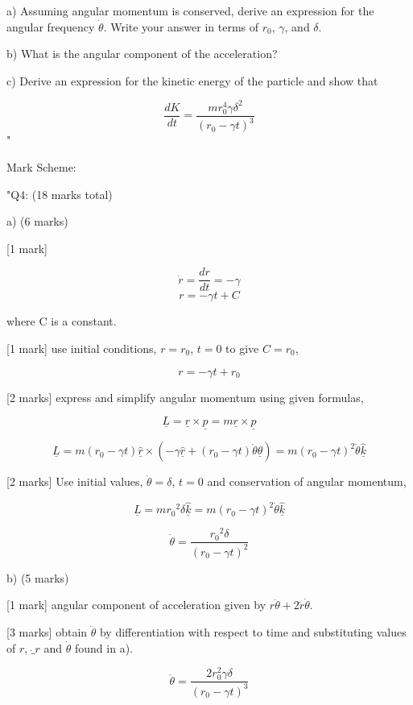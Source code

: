 a) Assuming angular momentum is conserved, derive an expression for the angular frequency \( \dot{\theta} \). Write your answer in terms of \( r_{0} \), \( \gamma \), and \( \delta \).
    
b) What is the angular component of the acceleration?
    
c) Derive an expression for the kinetic energy of the particle and show that 
    
\[
\frac{dK}{dt} = \frac{m r_{0}^{4} \gamma \delta^{2}}{(r_{0} - \gamma t)^{3}}
\]"

Mark Scheme:

"{Q4: (18 marks total)}

a) (6 marks)

[1 mark] 

\[ \dot{r} = \frac{dr}{dt} = - \gamma \]
\[ r = - \gamma t + C \]

where C is a constant.

[1 mark] use initial conditions, \( r = r_0 \), \( t = 0 \) to give \( C = r_0 \), 

\[ r = - \gamma t + r_0 \]

[2 marks] express and simplify angular momentum using given formulas, 

\[ \underline{L} = \underline{r} \times \underline{p} = m \underline{r} \times \underline{p} \]

\[ \underline{L} = m (r_0 - \gamma t) \hat{\underline{r}} \times \left ( - \gamma \hat{\underline{r}} + (r_0 - \gamma t ) \dot{\theta} \hat{\underline{\theta}} \right ) = m (r_0 - \gamma t)^2 \dot{\theta} \hat{\underline{k}} \]

[2 marks] Use initial values, \( \dot{\theta} = \delta \), \(t = 0 \) and conservation of angular momentum, 

\[ \underline{L}  = m {r_0}^2 \delta \hat{\underline{k}} = m (r_0 - \gamma t)^2 \dot{\theta} \hat{\underline{k}} \]

\[ \dot{\theta} = \frac{{r_0}^2 \delta}{(r_0 - \gamma t)^2} \]

b) (5 marks)

[1 mark] angular component of acceleration given by  \( r \ddot{\theta} + 2\dot{r}\dot{\theta} \).

[3 marks] obtain \( \ddot{\theta} \) by differentiation with respect to time and substituting values of \( r \), \( \dot_{r} \) and \( \dot{\theta} \) found in a). 

\[ \ddot{\theta} = \frac{2r_0^2 \gamma \delta}{(r_0 - \gamma t)^3} \]

